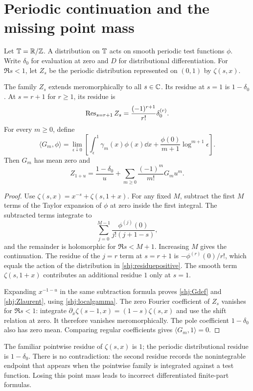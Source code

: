 \section{Periodic continuation and the missing point mass}\label{shj:periodic}
Let $\mathbb T=\mathbb R/\mathbb Z$. A distribution on $\mathbb T$ acts on smooth periodic test functions $\phi$. Write $\delta_0$ for evaluation at zero and $D$ for distributional differentiation. For $\Re s<1$, let $Z_s$ be the periodic distribution represented on $(0,1)$ by $\zeta(s,x)$.

\begin{lemma}\label{shj:periodicresidue}
The family $Z_s$ extends meromorphically to all $s\in\mathbb C$. Its residue at $s=1$ is $1-\delta_0$. At $s=r+1$ for $r\ge1$, its residue is
\begin{equation}\label{shj:residuepositive}
\operatorname{Res}_{s=r+1}Z_s=\frac{(-1)^{r+1}}{r!}\delta_0^{(r)}.
\end{equation}
For every $m\ge0$, define
\begin{equation}\label{shj:Gdef}
\langle G_m,\phi\rangle=
\lim_{\epsilon\downarrow0}\left[
\int_\epsilon^1\gamma_m(x)\phi(x)\dd x
+\frac{\phi(0)}{m+1}\log^{m+1}\epsilon\right].
\end{equation}
Then $G_m$ has mean zero and
\begin{equation}\label{shj:Zlaurent}
Z_{1+u}=\frac{1-\delta_0}{u}
+\sum_{m\ge0}\frac{(-1)^m}{m!}G_m u^m.
\end{equation}
\end{lemma}
\begin{proof}
Use $\zeta(s,x)=x^{-s}+\zeta(s,1+x)$. For any fixed $M$, subtract the first $M$ terms of the Taylor expansion of $\phi$ at zero inside the first integral. The subtracted terms integrate to
\[
\sum_{j=0}^{M-1}\frac{\phi^{(j)}(0)}{j!(j+1-s)},
\]
and the remainder is holomorphic for $\Re s<M+1$. Increasing $M$ gives the continuation. The residue of the $j=r$ term at $s=r+1$ is $-\phi^{(r)}(0)/r!$, which equals the action of the distribution in \eqref{shj:residuepositive}. The smooth term $\zeta(s,1+x)$ contributes an additional residue $1$ only at $s=1$.

Expanding $x^{-1-u}$ in the same subtraction formula proves \eqref{shj:Gdef} and \eqref{shj:Zlaurent}, using \eqref{shj:localgamma}. The zero Fourier coefficient of $Z_s$ vanishes for $\Re s<1$: integrate $\partial_x\zeta(s-1,x)=(1-s)\zeta(s,x)$ and use the shift relation at zero. It therefore vanishes meromorphically. The pole coefficient $1-\delta_0$ also has zero mean. Comparing regular coefficients gives $\langle G_m,1\rangle=0$.
\end{proof}
The familiar pointwise residue of $\zeta(s,x)$ is $1$; the periodic distributional residue is $1-\delta_0$. There is no contradiction: the second residue records the nonintegrable endpoint that appears when the pointwise family is integrated against a test function. Losing this point mass leads to incorrect differentiated finite-part formulas.

